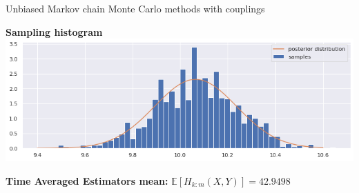 \documentclass{beamer}
\begin{document}
\begin{section}{Unbiased Markov chain Monte Carlo methods with couplings}
\begin{frame}
		\vspace{0.2cm}
	
		\begin{minipage}{0.48\textwidth}
			\begin{center}
				{\scriptsize \textbf{Sampling histogram}}
				\includegraphics[width=\textwidth]{immagini_coupling/hist_coupling}
			\end{center}
		\end{minipage}
		\hfill
		\begin{minipage}{0.48\textwidth}
			\begin{center}
				{\small\textbf{Time Averaged Estimators mean:}}
				$ \mathbb{E}[H_{k:m}(X,Y)] = 42.9498$
			\end{center}
		\end{minipage}
		
	\end{frame}
	
\end{section}
\end{document}
